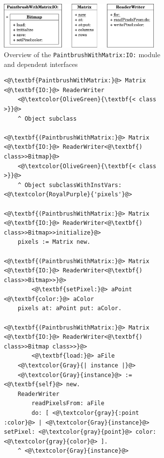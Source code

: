 \begin{figure}[!htp]
\begin{subfigure}[b]{\textwidth}
\centering
\includegraphics[width=0.9\textwidth]{usecase_paintbrush.pdf}
\caption{Overview of the \texttt{PaintbrushWithMatrix:IO:} module and dependent interfaces}
\end{subfigure}

\vspace{10pt}

\begin{subfigure}[b]{\textwidth}
\begin{lstlisting}
<@\textbf{PaintbrushWithMatrix:}@> Matrix <@\textbf{IO:}@> ReaderWriter
    <@\textcolor{OliveGreen}{\textbf{< class >}}@>
    ^ Object subclass

<@\textbf{(PaintbrushWithMatrix:}@> Matrix <@\textbf{IO:}@> ReaderWriter<@\textbf{) class>>Bitmap}@>
    <@\textcolor{OliveGreen}{\textbf{< class >}}@>
    ^ Object subclassWithInstVars: <@\textcolor{RoyalPurple}{'pixels'}@>

<@\textbf{(PaintbrushWithMatrix:}@> Matrix <@\textbf{IO:}@> ReaderWriter<@\textbf{) class>>Bitmap>>initialize}@>
    pixels := Matrix new.

<@\textbf{(PaintbrushWithMatrix:}@> Matrix <@\textbf{IO:}@> ReaderWriter<@\textbf{) class>>Bitmap>>}@>
        <@\textbf{setPixel:}@> aPoint <@\textbf{color:}@> aColor
    pixels at: aPoint put: aColor.

<@\textbf{(PaintbrushWithMatrix:}@> Matrix <@\textbf{IO:}@> ReaderWriter<@\textbf{) class>>Bitmap class>>}@>
        <@\textbf{load:}@> aFile
    <@\textcolor{Gray}{| instance |}@>
    <@\textcolor{Gray}{instance}@> := <@\textbf{self}@> new.
    ReaderWriter 
        readPixelsFrom: aFile
        do: [ <@\textcolor{gray}{:point :color}@> | <@\textcolor{Gray}{instance}@> setPixel: <@\textcolor{gray}{point}@> color: <@\textcolor{gray}{color}@> ].
    ^ <@\textcolor{Gray}{instance}@>


\end{lstlisting}
\end{subfigure}
\end{figure}
